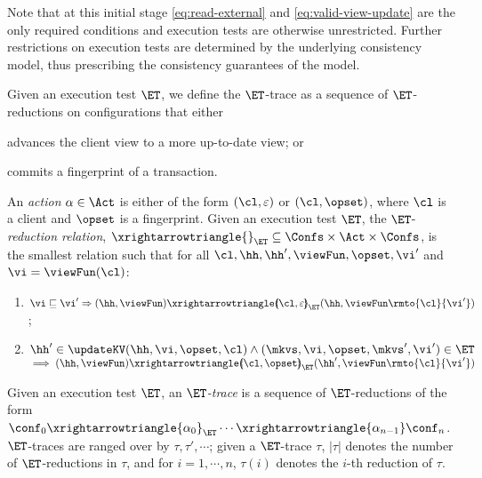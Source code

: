 Note that at this initial stage \eqref{eq:read-external} and \eqref{eq:valid-view-update} are the only required conditions and execution tests are otherwise unrestricted. 
Further restrictions on execution tests are determined by the underlying consistency model, thus prescribing the consistency guarantees of the model.

Given an execution test  $\ET$, we define the $\ET$-trace as a sequence of $\ET$-reductions on configurations that either 
\begin{enumerate*}
	\item advances the client view to a more up-to-date view; or 
	\item commits a fingerprint of a transaction. 
\end{enumerate*}

\begin{definition}[$\ET$-trace]
\label{def:reduction}
An \emph{action} $\alpha \in \Act$ is either of the form $(\cl, \varepsilon)$ or $(\cl, \opset)$, 
where $\cl$ is a client and $\opset$ is a fingerprint. 
Given an execution test $\ET$, the $\ET$-\emph{reduction relation},
$\xrightarrowtriangle{}_{\ET} \subseteq \Confs \times \Act \times \Confs$, 
is the smallest relation such that for all $\cl, \hh, \hh', \viewFun, \opset, \vi'$ and $\vi = \viewFun(\cl)$:
\begin{enumerate}
	\item
    $\vi \sqsubseteq \vi'
    \Rightarrow
    (\hh, \viewFun) \xrightarrowtriangle{\hspace{-5pt}(\cl, \varepsilon)\hspace{-5pt}}_{\ET} 
    (\hh, \viewFun\rmto{\cl}{\vi'})$; 
	\item 
    $\hh' \in \updateKV(\hh, \vi , \opset, \cl)
     \wedge (\mkvs, \vi, \opset, \mkvs', \vi') \in \ET
	$  \\
	\phantom{a} \hfill $\implies (\hh, \viewFun) \xrightarrowtriangle{\hspace{-5pt}(\cl, \opset)\hspace{-5pt}}_{\ET} (\hh', \viewFun\rmto{\cl}{\vi'})$
\end{enumerate}
Given an execution test $\ET$, an \emph{$\ET$-trace} is a sequence of $\ET$-reductions of the form $\conf_{0} \xrightarrowtriangle{\alpha_{0}}_{\ET} \cdots 
\xrightarrowtriangle{\alpha_{n-1}} \conf_{n}$. $\ET$-traces are ranged over by $\tau, \tau', \cdots$; 
given a $\ET$-trace $\tau$, $\lvert \tau \rvert$ denotes the number of $\ET$-reductions in $\tau$, and 
for $i=1,\cdots,n$, $\tau(i)$ denotes the $i$-th reduction of $\tau$.
\end{definition}


